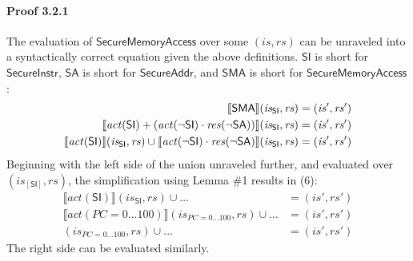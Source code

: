 \documentclass[12pt, letterpaper]{article}
\begin{document}
\paragraph{Proof 3.2.1}
    The evaluation of $\mathsf{SecureMemoryAccess}$ over some $(\mathit{is},\mathit{rs})$ can be unraveled into a syntactically correct equation given the above definitions.  $\mathsf{SI}$ is short for $\mathsf{SecureInstr}$, $\mathsf{SA}$ is short for $\mathsf{SecureAddr}$, and $\mathsf{SMA}$ is short for $\mathsf{SecureMemoryAccess}$:
\begin{align}
    \setcounter{equation}{0}
    \llbracket \mathsf{SMA} \rrbracket (\mathit{is_{\mathsf{SI}}}, \mathit{rs})
    &=
    (\mathit{is}', \mathit{rs}')
    \\
    \llbracket \mathit{act}(\mathsf{SI}) +
    (\mathit{act}(\neg\mathsf{SI}) \cdot
     \mathit{res}(\neg\mathsf{SA})) \rrbracket (\mathit{is_{\mathsf{SI}}}, \mathit{rs})
    &=
    (\mathit{is}', \mathit{rs}')
    \\
    \llbracket \mathit{act}(\mathsf{SI}) \rrbracket (\mathit{is_{\mathsf{SI}}}, \mathit{rs}) \cup %
    \llbracket \mathit{act}(\neg\mathsf{SI}) \cdot
     \mathit{res}(\neg\mathsf{SA}) \rrbracket (\mathit{is_{\mathsf{SI}}}, \mathit{rs})
    &=
    (\mathit{is}', \mathit{rs}')
\end{align}
    Beginning with the left side of the union unraveled further, and evaluated over $(\mathit{is}_{[\mathsf{SI}]},\mathit{rs})$, the simplification using Lemma \#1 results in (6):
\begin{align}
    \llbracket \mathit{act} (\mathsf{SI}) \rrbracket (\mathit{is_{\mathsf{SI}}}, \mathit{rs}) \cup \ldots
    &=
    (\mathit{is}', \mathit{rs}')
    \\
    \llbracket \mathit{act} (PC=0\ldots 100) \rrbracket (\mathit{is_{PC=0\ldots100}}, \mathit{rs}) \cup \ldots %
    &=
    (\mathit{is}', \mathit{rs}')
    \\
    (\mathit{is_{PC=0\ldots100}}, \mathit{rs}) \cup \ldots 
    &=
    (\mathit{is}', \mathit{rs}')
\end{align}
    The right side can be evaluated similarly.
\end{document}

